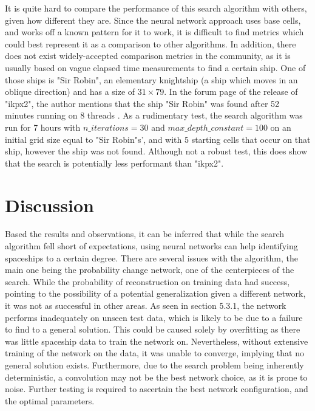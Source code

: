 \documentclass{l4proj}
\begin{document}
It is quite hard to compare the performance of this search algorithm with others, given how different they are. Since the neural network approach uses base cells, and works off a known pattern for it to work, it is difficult to find metrics which could best represent it as a comparison to other algorithms. In addition, there does not exist widely-accepted comparison metrics in the community, as it is usually based on vague elapsed time measurements to find a certain ship. One of those ships is "Sir Robin", an elementary knightship (a ship which moves in an oblique direction) and has a size of $31 \times 79$. In the forum page of the release of "ikpx2", the author mentions that the ship "Sir Robin" was found after 52 minutes running on 8 threads \citep{ikpx}. As a rudimentary test, the search algorithm was run for 7 hours with $n\_iterations = 30$ and $max\_depth\_constant = 100$ on an initial grid size equal to "Sir Robin"s', and with 5 starting cells that occur on that ship, however the ship was not found. Although not a robust test, this does show that the search is potentially less performant than "ikpx2".

\section{Discussion}

Based the results and observations, it can be inferred that while the search algorithm fell short of expectations, using neural networks can help identifying spaceships to a certain degree. There are several issues with the algorithm, the main one being the probability change network, one of the centerpieces of the search. While the probability of reconstruction on training data had success, pointing to the possibility of a potential generalization given a different network, it was not as successful in other areas. As seen in section 5.3.1, the network performs inadequately on unseen test data, which is likely to be due to a failure to find to a general solution. This could be caused solely by overfitting as there was little spaceship data to train the network on. Nevertheless, without extensive training of the network on the data, it was unable to converge, implying that no general solution exists. Furthermore, due to the search problem being inherently deterministic, a convolution may not be the best network choice, as it is prone to noise. Further testing is required to ascertain the best network configuration, and the optimal parameters.
\end{document}
